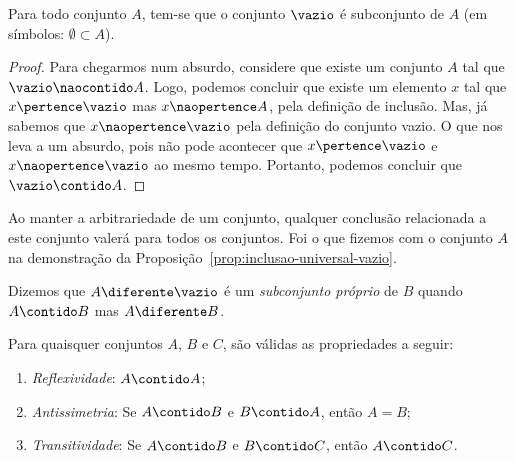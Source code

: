 \begin{proposition}
	\label{prop:inclusao-universal-vazio}
	Para todo conjunto $A$, tem-se que o conjunto $\vazio$ é subconjunto de $A$ (em símbolos: $\emptyset \subset A$).
\end{proposition}

\begin{proof}
	Para chegarmos num absurdo, considere que existe um conjunto $A$ tal que $\vazio \naocontido A$. Logo, podemos concluir que existe um elemento $x$ tal que $x \pertence \vazio$ mas $x \naopertence A$, pela definição de inclusão. Mas, já sabemos que $x \naopertence \vazio$ pela definição do conjunto vazio. O que nos leva a um absurdo, pois não pode acontecer que $x \pertence \vazio$ e $x \naopertence \vazio$ ao mesmo tempo. Portanto, podemos concluir que $\vazio \contido A$.
\end{proof}

\begin{remark}
	Ao manter a arbitrariedade de um conjunto, qualquer conclusão relacionada a este conjunto valerá para todos os conjuntos. Foi o que fizemos com o conjunto $A$ na demonstração da Proposição~\ref{prop:inclusao-universal-vazio}.
\end{remark}

\begin{definition}
	Dizemos que $A \diferente \vazio$ é um \emph{subconjunto próprio} de $B$ quando $A \contido B$ mas $A \diferente B$.
\end{definition}

\begin{proposition}
	Para quaisquer conjuntos $A$, $B$ e $C$, são válidas as propriedades a seguir:
	\begin{enumerate}
		\item
			\label{inclusao:reflexividade}
			\emph{Reflexividade}: $A \contido A$;
		\item
			\label{inclusao:antissimetria}
			\emph{Antissimetria}: Se $A \contido B$ e $B \contido A$, então $A = B$;
		\item
			\label{inclusao:transitividade}
			\emph{Transitividade}: Se $A \contido B$ e $B \contido C$, então $A \contido C$.
	\end{enumerate}
\end{proposition}

